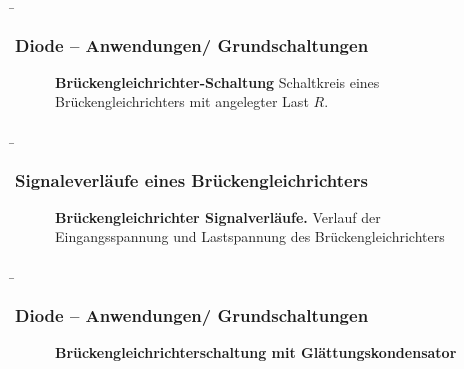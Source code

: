 \begin{frame}
    \b{ 
        \frametitle{Diode -- Anwendungen/ Grundschaltungen}
        \begin{figure}[H]
            \centering
            
            \label{fig:BrueckengleichrichterSchaltungFolie}
            \caption{\textbf{Brückengleichrichter-Schaltung} Schaltkreis eines Brückengleichrichters mit angelegter Last $R$.}
        \end{figure}
    }
\end{frame}

\begin{frame}
    \b{
        \frametitle{Signaleverläufe eines Brückengleichrichters}
        \begin{figure}[H]
            \centering
            
            \caption{\textbf{Brückengleichrichter Signalverläufe.} Verlauf der Eingangsspannung und Lastspannung des
                Brückengleichrichters }
            \label{fig:BrueckengleichrichterSignalverlaeufeFolie}
        \end{figure}
    }
\end{frame}

\begin{frame}
    \b{
        \frametitle{Diode -- Anwendungen/ Grundschaltungen}
        \begin{figure}[H]
            \centering
            
            \caption{\textbf{Brückengleichrichterschaltung mit Glättungskondensator}}
        \end{figure}
    }
\end{frame}

